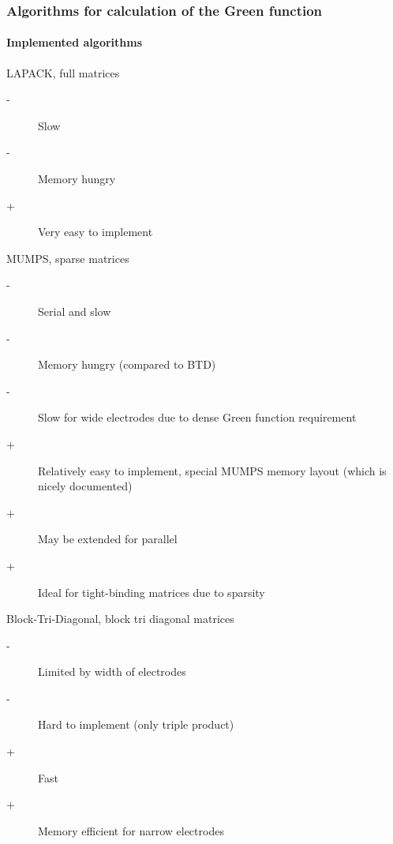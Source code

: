\begin{frame}
  \frametitle{Algorithms for calculation of the Green function}
  \framesubtitle{Implemented algorithms}

  \footnotesize
  \begin{block}{\small LAPACK, full matrices}

    \begin{description}
      \item[-] Slow
      \item[-] Memory hungry
      \item[+] Very easy to implement
    \end{description}

  \end{block}

  \begin{block}{\small MUMPS, sparse matrices}

    \begin{description}
      \item[-] Serial and slow
      \item[-] Memory hungry (compared to BTD)
      \item[-] Slow for wide electrodes due to dense Green function requirement
      \item[+] Relatively easy to implement, special MUMPS memory layout (which is nicely documented)
      \item[+] May be extended for parallel
      \item[+] Ideal for tight-binding matrices due to sparsity
    \end{description}

  \end{block}

  \begin{block}{\small Block-Tri-Diagonal, block tri diagonal matrices}

    \begin{description}
      \item[-] Limited by width of electrodes
      \item[-] Hard to implement (only triple product)
      \item[+] Fast
      \item[+] Memory efficient for narrow electrodes
    \end{description}

  \end{block}

\end{frame}



